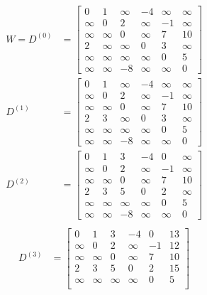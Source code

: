 \documentclass{article}
\begin{document}
\begin{enumerate}
\begin{align*}
    W = D^{(0)} & =
    \begin{bmatrix}
        0 & 1 & \infty & -4 & \infty & \infty \\
        \infty & 0 & 2 & \infty & -1 & \infty \\
        \infty & \infty & 0 & \infty & 7 & 10 \\
        2 & \infty & \infty & 0 & 3 & \infty \\
        \infty & \infty & \infty & \infty & 0 & 5 \\
        \infty & \infty & -8 & \infty & \infty & 0
    \end{bmatrix} \\
    D^{(1)} & = 
    \begin{bmatrix}
        0 & 1 & \infty & -4 & \infty & \infty \\
        \infty & 0 & 2 & \infty & -1 & \infty \\
        \infty & \infty & 0 & \infty & 7 & 10 \\
        2 & 3 & \infty & 0 & 3 & \infty \\
        \infty & \infty & \infty & \infty & 0 & 5 \\
        \infty & \infty & -8 & \infty & \infty & 0
    \end{bmatrix} \\
    D^{(2)} & = 
    \begin{bmatrix}
        0 & 1 & 3 & -4 & 0 & \infty \\
        \infty & 0 & 2 & \infty & -1 & \infty \\
        \infty & \infty & 0 & \infty & 7 & 10 \\
        2 & 3 & 5 & 0 & 2 & \infty \\
        \infty & \infty & \infty & \infty & 0 & 5 \\
        \infty & \infty & -8 & \infty & \infty & 0
    \end{bmatrix} \\
\end{align*}
\begin{align*}
    D^{(3)} & = 
    \begin{bmatrix}
        0 & 1 & 3 & -4 & 0 & 13 \\
        \infty & 0 & 2 & \infty & -1 & 12 \\
        \infty & \infty & 0 & \infty & 7 & 10 \\
        2 & 3 & 5 & 0 & 2 & 15 \\
        \infty & \infty & \infty & \infty & 0 & 5 \\

\end{bmatrix}
\end{align*}
\end{enumerate}
\end{document}
